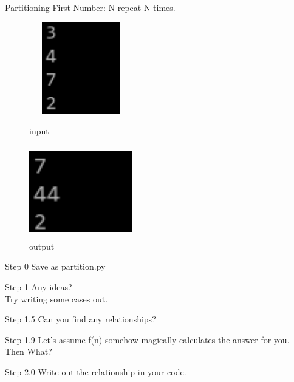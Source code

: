 \documentclass{beamer}
\begin{document}
\begin{frame}{Partitioning}
First Number: N
repeat N times.
\begin{figure}[H]
  \centering
  \begin{minipage}{.45\textwidth}
  \centering
    \includegraphics[width=45mm,height=40mm]{./part_input.png}
    \caption*{input}
  \end{minipage}
  \begin{minipage}{.45\textwidth}
  \centering
    \includegraphics[width=45mm,height=40mm]{./part_out.png}
    \caption*{output}
  \end{minipage}
\end{figure}
\end{frame}

\begin{frame}{Step 0}
  Save as partition.py
\end{frame}

\begin{frame}{Step 1}
  Any ideas?\\
  Try writing some cases out.
\end{frame}

\begin{frame}{Step 1.5}
  Can you find any relationships?
\end{frame}

\begin{frame}{Step 1.9}
  Let's assume f(n) somehow magically calculates the answer for you.\\
  Then What?
\end{frame}

\begin{frame}{Step 2.0}
  Write out the relationship in your code.
\end{frame}
\end{document}

